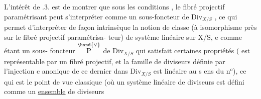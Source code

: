 L'intérêt de .3. est de montrer que sous les conditions ,
le fibré projectif paramétrisant peut s'interpréter comme un sous-foncteur
de Div$_{X/S}$ , ce qui permet d'interpréter de façon intrinsèque la notion
de classe (à isomorphisme près sur le  fibré projectif paramétrisa-%
teur) de système linéaire sur X/S, e comme étant un sous-
foncteur $\overset{\hand{\vee}}{\text{P}}$ de Div$_{X/S}$ qui satisfait certaines propriétés ( est
représentable par un fibré projectif, et la famille de diviseurs définie
par l'injection c anonique de ce dernier dans Div$_{X/S}$ est linéaire au s ens
du n$^{o}$), ce qui est  le point de vue classique (où un
système linéaire de diviseurs est défini comme un \uline{ensemble} de diviseurs

